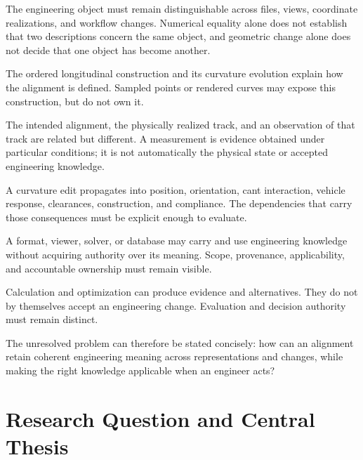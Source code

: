 \begin{description}[style=nextline]
\item[Identity]
The engineering object must remain distinguishable across files, views,
coordinate realizations, and workflow changes. Numerical equality alone does
not establish that two descriptions concern the same object, and geometric
change alone does not decide that one object has become another.

\item[Constructive intent]
The ordered longitudinal construction and its curvature evolution explain how
the alignment is defined. Sampled points or rendered curves may expose this
construction, but do not own it.

\item[Reality and observation]
The intended alignment, the physically realized track, and an observation of
that track are related but different. A measurement is evidence obtained under
particular conditions; it is not automatically the physical state or accepted
engineering knowledge.

\item[Change and consequence]
A curvature edit propagates into position, orientation, cant interaction,
vehicle response, clearances, construction, and compliance. The dependencies
that carry those consequences must be explicit enough to evaluate.

\item[Knowledge ownership]
A format, viewer, solver, or database may carry and use engineering knowledge
without acquiring authority over its meaning. Scope, provenance,
applicability, and accountable ownership must remain visible.

\item[Decision]
Calculation and optimization can produce evidence and alternatives. They do not
by themselves accept an engineering change. Evaluation and decision authority
must remain distinct.
\end{description}

The unresolved problem can therefore be stated concisely: how can an alignment
retain coherent engineering meaning across representations and changes, while
making the right knowledge applicable when an engineer acts?

\section{Research Question and Central Thesis}

